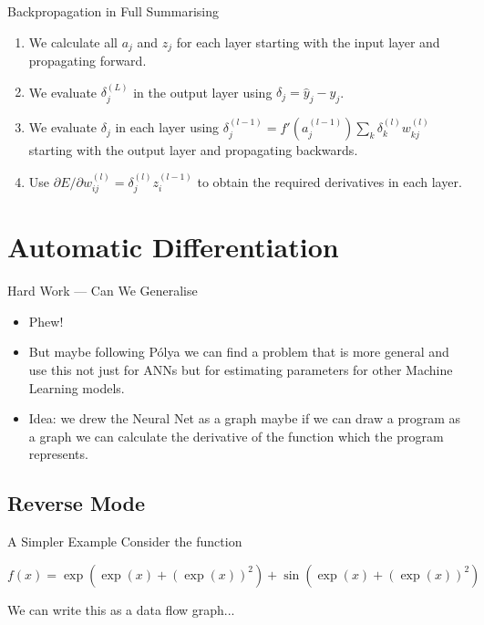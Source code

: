 \documentclass{beamer}
\begin{document}
\begin{frame}[fragile]{Backpropagation in Full}
Summarising

\begin{enumerate}
\item
We calculate all $a_j$ and $z_j$ for each layer starting with the
input layer and propagating forward.
\item
We evaluate $\delta_j^{(L)}$ in the output layer using $\delta_j = \hat{y}_j - y_j$.
\item
We evaluate $\delta_j$ in each layer using $\delta_j^{(l-1)} =
f'(a_j^{(l-1)})\sum_k \delta_k^{(l)} w_{kj}^{(l)}$ starting with the output
layer and propagating backwards.
\item
Use $\partial E / \partial w_{ij}^{(l)} = \delta_j^{(l)} z_i^{(l-1)}$ to obtain the
required derivatives in each layer.
\end{enumerate}
\end{frame}

\section{Automatic Differentiation}

\begin{frame}[fragile]{Hard Work --- Can We Generalise}
\begin{itemize}
\item
Phew!
\item
But maybe following P\'{o}lya we can find a problem that is more
general and use this not just for ANNs but for estimating parameters
for other Machine Learning models.
\item
Idea: we drew the Neural Net as a graph maybe if we can draw a program as a
graph we can calculate the derivative of the function which the
program represents.
\end{itemize}
\end{frame}

\subsection{Reverse Mode}

\begin{frame}[fragile]{A Simpler Example}
Consider the function

$$
f(x) = \exp(\exp(x) + (\exp(x))^2) + \sin(\exp(x) + (\exp(x))^2)
$$

We can write this as a data flow graph...
\end{frame}
\end{document}
